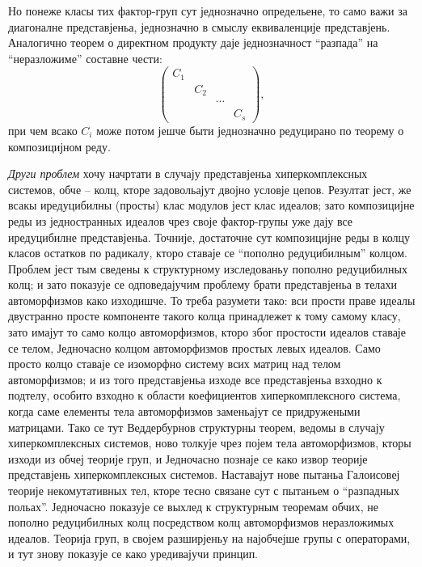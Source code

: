 ﻿\documentclass[11pt]{article}
\begin{document}
Но понеже класы тих фактор-груп сут једнозначно определьене, то само важи за диагоналне представјеньа, једнозначно в смыслу еквиваленције представјень. Аналогично теорем о директном продукту даје једнозначност “разпада” на “неразложиме” составне чести:
\[
\begin{pmatrix}
C_1&&&\\
&C_2&&\\
&&\cdots&\\
&&&C_s
\end{pmatrix},
\]
при чем всако $C_i$ може потом јешче быти једнозначно редуцирано по теорему о композицијном реду.

\emph{Други проблем} хочу начртати в случају представјеньа хиперкомплексных системов, обче -- колц, кторе задовольајут двојно условје цепов. Резултат јест, же всакы иредуцибилны (просты) клас модулов јест клас идеалов; зато композицијне реды из једностранных идеалов чрез своје фактор-групы уже дају все иредуцибилне представјеньа. Точније, достаточне сут композицијне реды в колцу класов остатков по радикалу, кторо ставаје се “пополно редуцибилным” колцом. Проблем јест тым сведены к структурному изследованьу пополно редуцибилных колц; и зато показује се одповедајучим проблему брати представјеньа в телахи автоморфизмов како изходишче. То треба разумети тако: вси прости праве идеалы двустранно просте компоненте такого колца принадлежет к тому самому класу, зато имајут то само колцо автоморфизмов, кторо због простости идеалов ставаје се телом, Једночасно колцом автоморфизмов простых левых идеалов. Само просто колцо ставаје се изоморфно систему всих матриц над телом автоморфизмов; и из того представјеньа изходе все представјеньа взходно к подтелу, особито взходно к области коефициентов хиперкомплексного система, когда саме елементы тела автоморфизмов заменьајут се придружеными матрицами. Тако се тут Веддербурнов структурны теорем, ведомы в случају хиперкомплексных системов, ново толкује чрез појем тела автоморфизмов, кторы изходи из обчеј теорије груп, и Једночасно познаје се како извор теорије представјень хиперкомплексных системов. Наставајут нове пытаньа Галоисовеј теорије некомутативных тел, кторе тесно связане сут с пытаньем о “разпадных польах”. Једночасно показује се выхлед к структурным теоремам обчих, не пополно редуцибилных колц посредством колц автоморфизмов неразложимых идеалов. Теорија груп, в својем разширјеньу на најобчејше групы с операторами, и тут знову показује се како уредивајучи принцип.
\end{document}
